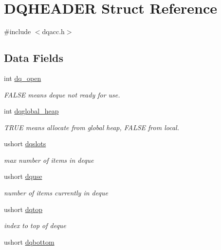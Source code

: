 \hypertarget{struct_d_q_h_e_a_d_e_r}{\section{D\-Q\-H\-E\-A\-D\-E\-R Struct Reference}
\label{struct_d_q_h_e_a_d_e_r}
}


{\ttfamily \#include $<$dqacc.\-h$>$}

\subsection*{Data Fields}
\begin{DoxyCompactItemize}
\item 
int \hyperlink{struct_d_q_h_e_a_d_e_r_a2cfb815275868f448170339b01fb68a6}{dq\-\_\-open}
\begin{DoxyCompactList}\small\item\em F\-A\-L\-S\-E means deque not ready for use. \end{DoxyCompactList}\item 
int \hyperlink{struct_d_q_h_e_a_d_e_r_a4d188b9298c3ffeab961c5bec1a4bbf5}{dqglobal\-\_\-heap}
\begin{DoxyCompactList}\small\item\em T\-R\-U\-E means allocate from global heap, F\-A\-L\-S\-E from local. \end{DoxyCompactList}\item 
ushort \hyperlink{struct_d_q_h_e_a_d_e_r_a569a481b9cdc53a7e96804a51643e504}{dqslots}
\begin{DoxyCompactList}\small\item\em max number of items in deque \end{DoxyCompactList}\item 
ushort \hyperlink{struct_d_q_h_e_a_d_e_r_a2fdb1d169ae74820026e2897a3dec9a3}{dquse}
\begin{DoxyCompactList}\small\item\em number of items currently in deque \end{DoxyCompactList}\item 
ushort \hyperlink{struct_d_q_h_e_a_d_e_r_ad2adafc57e3081492ed903ae8970f9de}{dqtop}
\begin{DoxyCompactList}\small\item\em index to top of deque \end{DoxyCompactList}\item 
ushort \hyperlink{struct_d_q_h_e_a_d_e_r_afca630b0864cea4021c566c2d2f07aa1}{dqbottom}

\end{DoxyCompactItemize}

